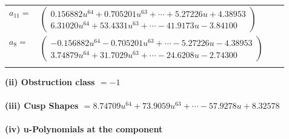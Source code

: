 \documentclass[1p]{elsarticle_modified}
\theoremstyle{definition}
\begin{document}
\begin{tabular}{m{7pt} m{180pt} m{7pt} m{180pt} }
\flushright $a_{11}=$&$\begin{pmatrix}0.156882 u^{64}+0.705201 u^{63}+\cdots+5.27226 u+4.38953\\6.31020 u^{64}+53.4331 u^{63}+\cdots-41.9173 u-3.84100\end{pmatrix}$ \\
\flushright $a_{8}=$&$\begin{pmatrix}-0.156882 u^{64}-0.705201 u^{63}+\cdots-5.27226 u-4.38953\\3.74879 u^{64}+31.7029 u^{63}+\cdots-24.6208 u-2.74300\end{pmatrix}$\\&\end{tabular}
\flushleft \textbf{(ii) Obstruction class $= -1$}\\~\\
\flushleft \textbf{(iii) Cusp Shapes $= 8.74709 u^{64}+73.9059 u^{63}+\cdots-57.9278 u+8.32578$}\\~\\
\newpage\renewcommand{\arraystretch}{1}
\flushleft \textbf{(iv) u-Polynomials at the component}\newline \\
\end{document}
